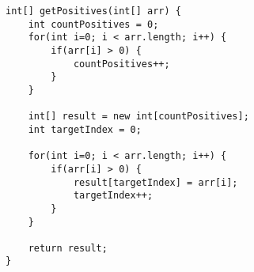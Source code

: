 \begin{questions}
\begin{solution}
\begin{lstlisting}
int[] getPositives(int[] arr) {
	int countPositives = 0;
	for(int i=0; i < arr.length; i++) {
		if(arr[i] > 0) {
			countPositives++;
		}
	}
	
	int[] result = new int[countPositives];
	int targetIndex = 0;
	
	for(int i=0; i < arr.length; i++) {
		if(arr[i] > 0) {
			result[targetIndex] = arr[i];
			targetIndex++;
		}
	}
	
	return result;
}	
\end{lstlisting}	
\end{solution}

\end{questions}